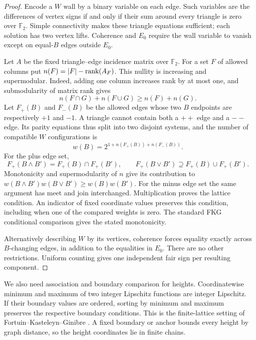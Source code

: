\begin{proof}
Encode a $W$ wall by a binary variable on each edge.  Such variables are
the differences of vertex signs if and only if their sum around every
triangle is zero over $\mathbb F_2$.  Simple connectivity makes these
triangle equations sufficient; each solution has two vertex lifts.
Coherence and $E_0$ require the wall variable to vanish except on
equal-$B$ edges outside $E_0$.

Let $A$ be the fixed triangle--edge incidence matrix over $\mathbb F_2$.
For a set $F$ of allowed columns put
$n(F)=\lvert F\rvert-\operatorname{rank}(A_F)$.  This nullity is increasing and
supermodular.  Indeed, adding one column increases rank by at most one,
and submodularity of matrix rank gives
\[
 n(F\cap G)+n(F\cup G)\geq n(F)+n(G).
\]
Let $F_+(B)$ and $F_-(B)$ be the allowed edges whose two $B$ endpoints
are respectively $+1$ and $-1$.  A triangle cannot contain both a $++$
edge and a $--$ edge.  Its parity equations thus split into two disjoint
systems, and the number of compatible $W$ configurations is
\begin{equation}\label{eq:spin-nullity-weight}
 w(B)=2^{1+n(F_+(B))+n(F_-(B))}.
\end{equation}
For the plus edge set,
\[
 F_+(B\wedge B')=F_+(B)\cap F_+(B'),\qquad
 F_+(B\vee B')\supseteq F_+(B)\cup F_+(B').
\]
Monotonicity and supermodularity of $n$ give its contribution to
$w(B\wedge B')w(B\vee B')\geq w(B)w(B')$.  For the minus edge set the
same argument has meet and join interchanged.  Multiplication proves the
lattice condition.  An indicator of fixed coordinate values preserves
this condition, including when one of the compared weights is zero.
The standard FKG conditional comparison gives the stated monotonicity.

Alternatively describing $W$ by its vertices, coherence forces equality
exactly across $B$-changing edges, in addition to the equalities in $E_0$.
There are no other restrictions.  Uniform counting gives one independent
fair sign per resulting component.
\end{proof}

We also need association and boundary comparison for heights.
Coordinatewise minimum and maximum of two integer Lipschitz functions
are integer Lipschitz.  If their boundary values are ordered, sorting by
minimum and maximum preserves the respective boundary conditions.
This is the finite-lattice setting of
Fortuin--Kasteleyn--Ginibre \cite{FKG1971}.  A fixed boundary or anchor
bounds every height by graph distance, so the height coordinates lie in
finite chains.

